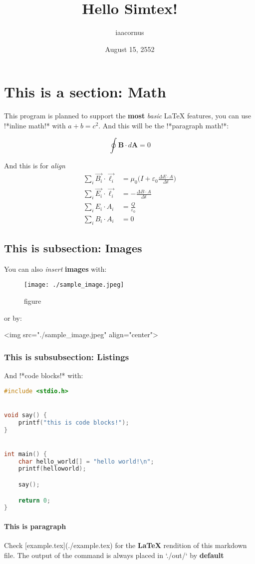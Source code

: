 \documentclass[12pt]{article}
\title{Hello Simtex!}
\author{iaacornus}
\date{August 15, 2552}
\begin{document}
	\maketitle
	
	\section{This is a section: Math}
	
	This program is planned to support the \textbf{most} \textit{basic} LaTeX features, you can use !*inline math!* with $a + b = c^2$. And this will be the !*paragraph math!*:
	
	\begin{equation}
		\oint \boldsymbol{B} \cdot d \boldsymbol{A} = 0
	\end{equation}
	
	And this is for \emph{align}
	\begin{align}
		\sum_{i} \vec{B_{i}} \cdot \vec{\ell_{i}} &= \mu_{0} \bigg(I + \varepsilon_{0} \frac{\Delta E \cdot A}{\Delta t} \bigg)\\
		\sum_{i} \vec{E_{i}} \cdot \vec{\ell_{i}} &= - \frac{\Delta B \cdot A}{\Delta t}\\
		\sum_{i} E_{i} \cdot A_{i} &= \frac{Q}{\varepsilon_{0}}\\
		\sum_{i} B_{i} \cdot A_{i} &= 0
	\end{align}
	
	\subsection{This is subsection: Images}
	
	You can also \textit{insert} \textbf{images} with:
	
	\begin{figure}[h]
		\texttt{[image: ./sample\_image.jpeg]}
		\caption{figure}
	\end{figure}
	
	or by:
	
	
	<img src="./sample\_image.jpeg" align="center">
	
	
	\subsubsection{This is subsubsection: Listings}
	
	And !*code blocks!* with:
	
	
\begin{lstlisting}[language=C]
#include <stdio.h>


void say() {
    printf("this is code blocks!");
}


int main() {
    char hello_world[] = "hello world!\n";
    printf(helloworld);

    say();

    return 0;
}
\end{lstlisting}
	
	\paragraph{This is paragraph}
	
	Check [example.tex](./example.tex) for the \textbf{LaTeX} rendition of this markdown file. The output of the command is always placed in `./out/` by \textbf{default}
\end{document}
